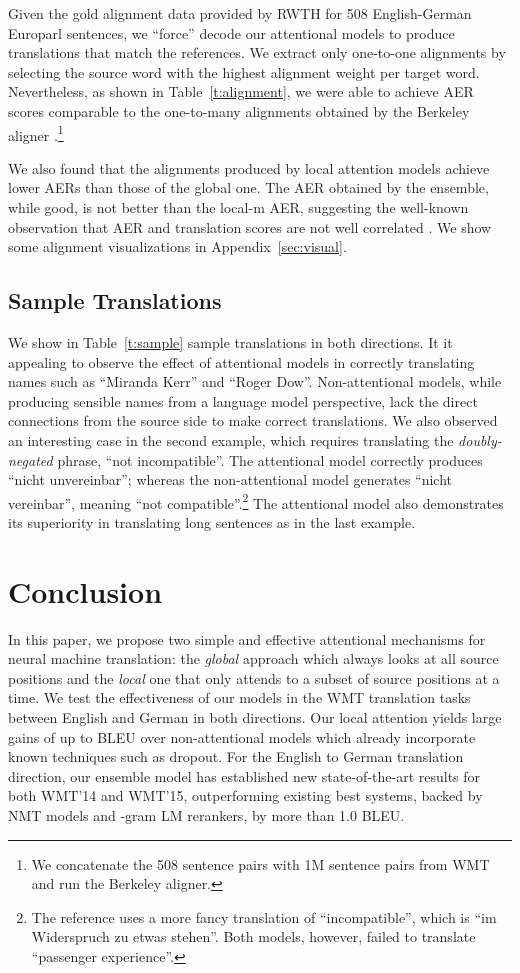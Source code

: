 \documentclass[11pt,a4paper]{article}
\begin{document}
Given the gold alignment data provided by RWTH for 508 English-German
Europarl sentences, we ``force'' decode our attentional models to
produce translations that match the references. We extract only one-to-one
alignments by selecting the source word with the highest alignment
weight per target word. Nevertheless, as shown in Table~\ref{t:alignment}, we were able to achieve AER scores
comparable to the one-to-many alignments obtained by the Berkeley aligner
\cite{liang06alignment}.\footnote{We concatenate the 508 sentence pairs with 1M
sentence pairs from WMT and run the Berkeley aligner.}

We also found that the alignments produced by local attention models achieve
lower AERs than those of the global one. The AER obtained by the ensemble, while
good, is not better than the local-m AER, suggesting the well-known
observation that AER and translation scores are not well correlated \cite{fraser07}.
We show some alignment visualizations in Appendix~\ref{sec:visual}.

\subsection{Sample Translations}
\label{sec:sample}
We show in Table~\ref{t:sample} sample translations in both directions. It it
appealing to observe the effect of attentional models in correctly translating
names such as ``Miranda Kerr'' and ``Roger Dow''. Non-attentional models, while producing sensible names from a language
model perspective, lack the direct connections from the source side to make
correct translations. We also observed an interesting case in the second
example, which requires translating the {\it doubly-negated} phrase, ``not incompatible''.
The attentional model correctly produces ``nicht  unvereinbar'';
whereas the non-attentional model generates ``nicht vereinbar'', meaning
``not compatible''.\footnote{The reference uses a more fancy translation of
``incompatible'', which is ``im Widerspruch zu etwas stehen''. Both models, however, failed to translate ``passenger
experience''.} The attentional
model also demonstrates its superiority in translating long sentences as in
the last example.


 


\section{Conclusion}
\label{sec:conclude}
In this paper, we propose two simple and effective attentional mechanisms for
neural machine translation: the {\it global} approach which always looks at all
source positions and the {\it local} one that only attends to a subset of source
positions at a time. We test the effectiveness of our models in the WMT
translation tasks between English and German in both directions. 
Our local attention yields large gains of up to
 BLEU over non-attentional models which already incorporate known
techniques such as dropout. For the English to German translation direction, our
ensemble model has established new state-of-the-art
results for both WMT'14 and WMT'15, outperforming existing
best systems, backed by NMT models and -gram LM rerankers, by more than 1.0 BLEU.
\end{document}

